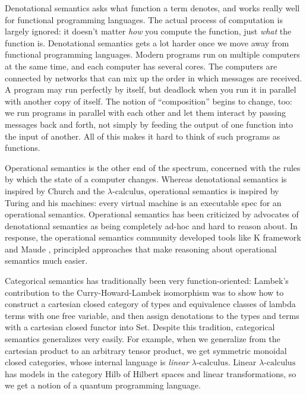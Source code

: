 \documentclass[a4paper,UKenglish]{article}
\newcommand{\lac}{$\lambda\mbox{-calculus}$\xspace}
\begin{document}
Denotational semantics asks what function a term denotes, and works really well for functional programming languages.  The actual process of computation is largely ignored: it doesn't matter {\em how} you compute the function, just {\em what} the function is.  Denotational semantics gets a lot harder once we move away from functional programming languages.  Modern programs run on multiple computers at the same time, and each computer has several cores. The computers are connected by networks that can mix up the order in which messages are received.  A program may run perfectly by itself, but deadlock when you run it in parallel with another copy of itself.  The notion of ``composition'' begins to change, too: we run programs in parallel with each other and let them interact by passing messages back and forth, not simply by feeding the output of one function into the input of another.  All of this makes it hard to think of such programs as functions.

Operational semantics is the other end of the spectrum, concerned with the rules by which the state of a computer changes.  Whereas denotational semantics is inspired by Church and the \lac, operational semantics is inspired by Turing and his machines: every virtual machine is an executable spec for an operational semantics.  Operational semantics has been criticized by advocates of denotational semantics as being completely ad-hoc and hard to reason about.  In response, the operational semantics community developed tools like K framework \cite{kframework} and Maude \cite{Maude}, principled approaches that make reasoning about operational semantics much easier.

Categorical semantics has traditionally been very function-oriented: Lambek's contribution \cite{Lambek} to the Curry-Howard-Lambek isomorphism was to show how to construct a cartesian closed category of types and equivalence classes of lambda terms with one free variable, and then assign denotations to the types and terms with a cartesian closed functor into Set.  Despite this tradition, categorical semantics generalizes very easily.  For example, when we generalize from the cartesian product to an arbitrary tensor product, we get symmetric monoidal closed categories, whose internal language is {\em linear} \lac.  Linear \lac has models in the category Hilb of Hilbert spaces and linear transformations, so we get a notion of a quantum programming language.
\end{document}
